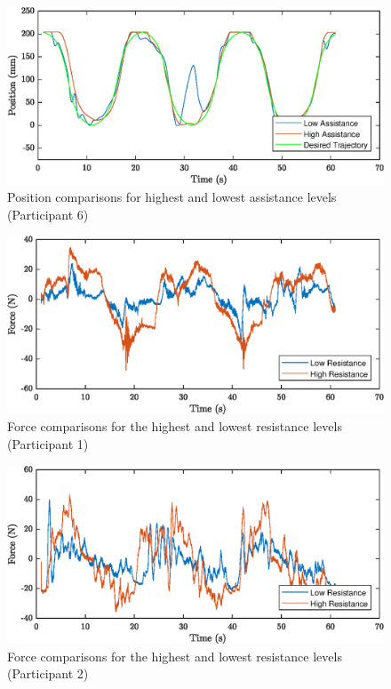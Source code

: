\documentclass[12pt]{report}
\begin{document}
\begin{figure}[h] 
	\centering
	\includegraphics[width=\linewidth]{pos6}
	\caption{Position comparisons for highest and lowest assistance levels (Participant 6)}
	\label{fig:pos6}
\end{figure}

\begin{figure}[h] 
	\centering
	\includegraphics[width=\linewidth]{force1}
	\caption{Force comparisons for the highest and lowest resistance levels (Participant 1)}
	\label{fig:force1}
\end{figure}

\begin{figure}[h] 
	\centering
	\includegraphics[width=\linewidth]{force2}
	\caption{Force comparisons for the highest and lowest resistance levels (Participant 2)}
	\label{fig:force2}
\end{figure}
\end{document}
